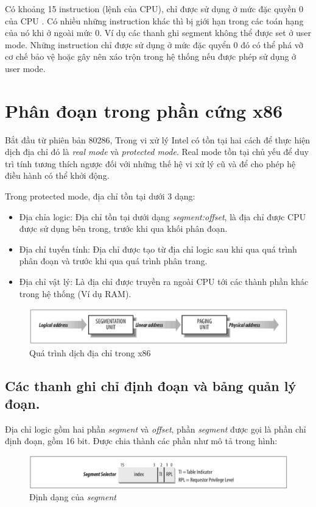 \documentclass[12pt]{report}
\begin{document}
Có khoảng 15 instruction (lệnh của CPU), chỉ được sử dụng ở mức đặc quyền 0 của CPU \cite{x86-rings}. Có nhiều những instruction khác thì bị giới hạn  trong các toán hạng của nó khi ở ngoài mức 0. Ví dụ các thanh ghi segment không thể được set ở user mode. Những instruction chỉ được sử dụng ở mức đặc quyển 0 đó có thể phá vỡ cơ chế bảo vệ hoặc gây nên xáo trộn trong hệ thống nếu được phép sử dụng ở user mode.

\section{Phân đoạn trong phần cứng x86}
Bắt đầu từ phiên bản 80286, Trong vi xử lý Intel có tồn tại hai cách để thực hiện dịch địa chỉ đó là \textit{real mode} và \textit{protected mode}. Real mode tồn tại chủ yếu để duy trì tính tương thích ngược đối với những thế hệ vi xử lý cũ và để cho phép hệ điều hành có thể khởi động. \cite{address_translation}

Trong protected mode, địa chỉ tồn tại dưới 3 dạng:
\begin{itemize}
\item Địa chỉa logic: Địa chỉ tồn tại dưới dạng \textit{segment:offset}, là địa chỉ được CPU được sử dụng bên trong, trước khi qua khối phân đoạn. 
\item Địa chỉ tuyến tính: Địa chỉ được tạo từ địa chỉ logic sau khi qua quá trình phân đoạn và trước khi qua quá trình phân trang. 
\item Địa chỉ vật lý: Là địa chỉ được truyền ra ngoài CPU tới các thành phần khác trong hệ thống (Ví dụ RAM).
\end{itemize}

\begin{figure}[h]
\centering
\caption{Quá trình dịch địa chỉ trong x86}
\includegraphics[width=\textwidth]{address_translation.png}
\end{figure}

\subsection{Các thanh ghi chỉ định đoạn và bảng quản lý đoạn.}
Địa chỉ logic gồm hai phần \textit{segment} và \textit{offset}, phần \textit{segment} được gọi là phần chỉ định đoạn, gồm 16 bit. Được chia thành các phần như mô tả trong hình: 
\begin{figure}[h]
\centering
\caption{Định dạng của \textit{segment}}
\includegraphics[width=\textwidth]{segment_selector.png}
\end{figure}
\end{document}
